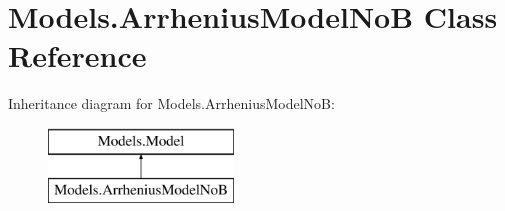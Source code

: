 \hypertarget{classModels_1_1ArrheniusModelNoB}{\section{\-Models.\-Arrhenius\-Model\-No\-B \-Class \-Reference}
\label{classModels_1_1ArrheniusModelNoB}
}
\-Inheritance diagram for \-Models.\-Arrhenius\-Model\-No\-B\-:\begin{figure}[H]
\begin{center}
\leavevmode
\includegraphics[height=2.000000cm]{classModels_1_1ArrheniusModelNoB}
\end{center}
\end{figure}
